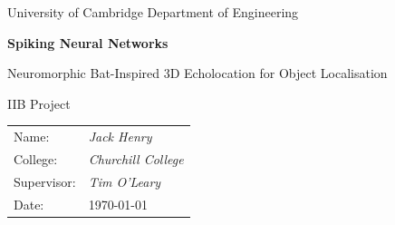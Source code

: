 \documentclass[12pt,a4paper]{report}
\begin{document}
\begin{titlepage}
  \centering
  \vspace*{2cm}
  {\Large University of Cambridge Department of Engineering\par}
  \vspace{1.5cm}
  {\Huge\bfseries Spiking Neural Networks \par}
    \vspace{1.5cm}
  {\LARGE Neuromorphic Bat-Inspired 3D Echolocation for Object Localisation \par}
  \vspace{1.5cm}
  {\Large IIB Project\par}
  \vfill
  \begin{tabular}{ll}
    Name: & \textit{Jack Henry}\\
    College: & \textit{Churchill College}\\
    Supervisor: & \textit{Tim O'Leary}\\
    Date: & \today\\
  \end{tabular}
\end{titlepage}






\clearpage

\tableofcontents



\clearpage












\appendix
\end{document}
